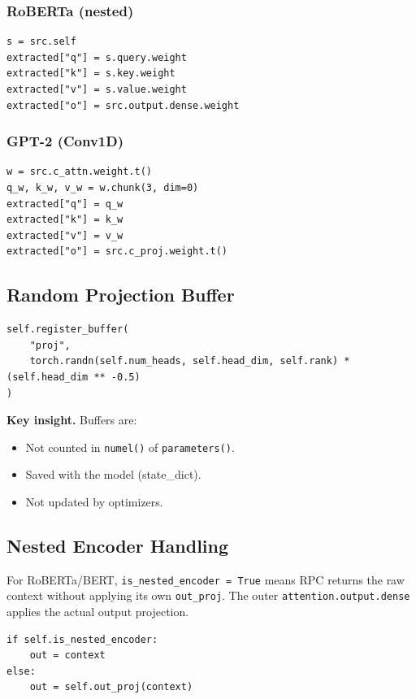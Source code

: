 \subsubsection{RoBERTa (nested)}

\begin{lstlisting}
s = src.self
extracted["q"] = s.query.weight
extracted["k"] = s.key.weight
extracted["v"] = s.value.weight
extracted["o"] = src.output.dense.weight
\end{lstlisting}

\subsubsection{GPT-2 (Conv1D)}

\begin{lstlisting}
w = src.c_attn.weight.t()
q_w, k_w, v_w = w.chunk(3, dim=0)
extracted["q"] = q_w
extracted["k"] = k_w
extracted["v"] = v_w
extracted["o"] = src.c_proj.weight.t()
\end{lstlisting}

\subsection{Random Projection Buffer}

\begin{lstlisting}
self.register_buffer(
    "proj",
    torch.randn(self.num_heads, self.head_dim, self.rank) * (self.head_dim ** -0.5)
)
\end{lstlisting}

\textbf{Key insight.} Buffers are:
\begin{itemize}
\item Not counted in \texttt{numel()} of \texttt{parameters()}.
\item Saved with the model (state\_dict).
\item Not updated by optimizers.

\end{itemize}
\subsection{Nested Encoder Handling}

For RoBERTa/BERT, \texttt{is\_nested\_encoder = True} means RPC returns the raw 
context without applying its own \texttt{out\_proj}. The outer \texttt{attention.output.dense} 
applies the actual output projection.

\begin{lstlisting}
if self.is_nested_encoder:
    out = context
else:
    out = self.out_proj(context)
\end{lstlisting}

